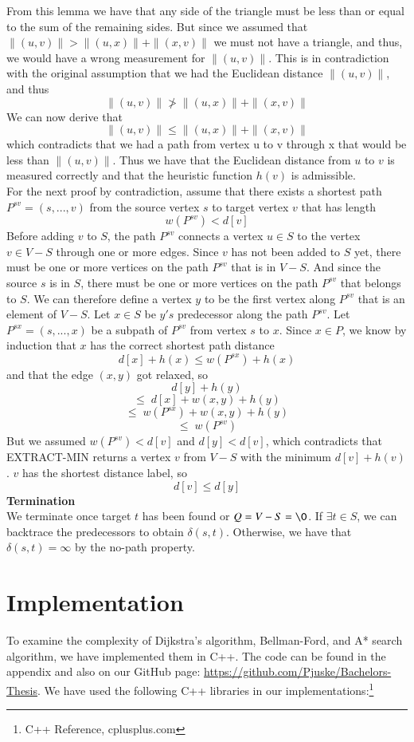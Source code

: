 \documentclass[11pt]{article}
\begin{document}
\noindent From this lemma we have that any side of the triangle must be less than or equal to the sum of the remaining sides. But since we assumed that $\|(u,v)\| > \|(u,x)\| + \|(x,v)\|$ we must not have a triangle, and thus, we would have a wrong measurement for $\|(u,v)\|$. This is in contradiction with the original assumption that we had the Euclidean distance $\|(u,v)\|$, and thus $$\|(u,v)\| \not > \|(u,x)\| + \|(x,v)\|$$
We can now derive that $$\|(u,v)\| \leq \|(u,x)\| + \|(x,v)\|$$which contradicts that we had a path from vertex u to v through x that would be less than $\|(u,v)\|$. Thus we have that the Euclidean distance from $u$ to $v$ is measured correctly and that the heuristic function $h(v)$ is admissible.\\

\noindent For the next proof by contradiction, assume that there exists a shortest path $P^{sv}=(s, ..., v)$ from the source vertex $s$ to target vertex $v$ that has length $$w(P^{sv}) < d[v]$$
Before adding $v$ to $S$, the path $P^{sv}$ connects a vertex $u\in S$ to the vertex $v\in V-S$ through one or more edges. Since $v$ has not been added to $S$ yet, there must be one or more vertices on the path $P^{sv}$ that is in $V-S$. And since the source $s$ is in $S$, there must be one or more vertices on the path $P^{sv}$ that belongs to $S$. We can therefore define a vertex $y$ to be the first vertex along $P^{sv}$ that is an element of $V-S$. Let $x\in S$ be $y's$ predecessor along the path $P^{sv}$. Let $P^{sx}=(s, ..., x)$ be a subpath of $P^{sv}$ from vertex $s$ to $x$. Since $x \in P$, we know by induction that $x$ has the correct shortest path distance $$d[x] + h(x) \leq w(P^{sx}) + h(x)$$and that the edge $(x,y)$ got relaxed, so $$d[y]+h(y)$$ 
$$\leq \; d[x]+w(x,y)+h(y)$$
$$\leq \; w(P^{sx}) + w(x,y) + h(y)$$
$$\leq \; w(P^{sv})$$But we assumed $w(P^{sv}) < d[v]$ and $d[y] < d[v]$, which contradicts that EXTRACT-MIN returns a vertex $v$ from $V-S$ with the minimum $d[v]+h(v)$. $v$ has the shortest distance label, so $$d[v] \leq d[y]$$
\textbf{Termination}\\
We terminate once target $t$ has been found or $Q = V-S =\O$. If $\exists t \in S$, we can backtrace the predecessors to obtain $\delta(s,t)$. Otherwise, we have that $\delta(s,t) = \infty$ by the no-path property.\\


\section{Implementation}
To examine the complexity of Dijkstra's algorithm, Bellman-Ford, and A* search algorithm, we have implemented them in C++. The code can be found in the appendix and also on our GitHub page: \url{https://github.com/Pjuske/Bachelors-Thesis}. We have used the following C++ libraries in our implementations:\footnote{C++ Reference, cplusplus.com}
\end{document}
